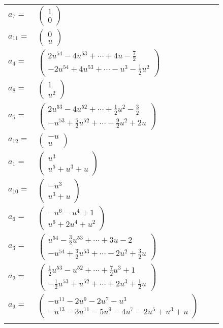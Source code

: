\documentclass[1p]{elsarticle_modified}
\theoremstyle{definition}
\begin{document}
\begin{tabular}{m{7pt} m{180pt} m{7pt} m{180pt} }
\flushright $a_{7}=$&$\begin{pmatrix}1\\0\end{pmatrix}$ \\
\flushright $a_{11}=$&$\begin{pmatrix}0\\u\end{pmatrix}$ \\
\flushright $a_{4}=$&$\begin{pmatrix}2 u^{54}-4 u^{53}+\cdots+4 u-\frac{7}{2}\\-2 u^{54}+4 u^{53}+\cdots- u^3-\frac{1}{2} u^2\end{pmatrix}$ \\
\flushright $a_{8}=$&$\begin{pmatrix}1\\u^2\end{pmatrix}$ \\
\flushright $a_{5}=$&$\begin{pmatrix}2 u^{53}-4 u^{52}+\cdots+\frac{1}{2} u^2-\frac{3}{2}\\- u^{53}+\frac{5}{2} u^{52}+\cdots-\frac{9}{2} u^2+2 u\end{pmatrix}$ \\
\flushright $a_{12}=$&$\begin{pmatrix}- u\\u\end{pmatrix}$ \\
\flushright $a_{1}=$&$\begin{pmatrix}u^3\\u^5+u^3+u\end{pmatrix}$ \\
\flushright $a_{10}=$&$\begin{pmatrix}- u^3\\u^3+u\end{pmatrix}$ \\
\flushright $a_{6}=$&$\begin{pmatrix}- u^6- u^4+1\\u^6+2 u^4+u^2\end{pmatrix}$ \\
\flushright $a_{3}=$&$\begin{pmatrix}u^{54}-\frac{3}{2} u^{53}+\cdots+3 u-2\\- u^{54}+\frac{3}{2} u^{53}+\cdots-2 u^2+\frac{3}{2} u\end{pmatrix}$ \\
\flushright $a_{2}=$&$\begin{pmatrix}\frac{1}{2} u^{53}- u^{52}+\cdots+\frac{7}{2} u^3+1\\-\frac{1}{2} u^{53}+u^{52}+\cdots+2 u^3+\frac{1}{2} u\end{pmatrix}$ \\
\flushright $a_{9}=$&$\begin{pmatrix}- u^{11}-2 u^9-2 u^7- u^3\\- u^{13}-3 u^{11}-5 u^9-4 u^7-2 u^5+u^3+u\end{pmatrix}$\\&\end{tabular}
\end{document}
